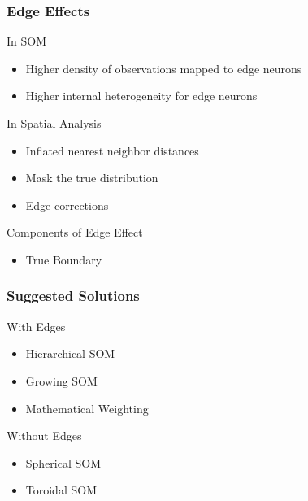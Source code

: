 \documentclass[nototal,handout]{beamer}
\begin{document}
\begin{frame}
	\frametitle{Edge Effects}
 
\begin{block}{In SOM}
 \begin{itemize}
 \item  Higher density of observations mapped to edge neurons
 \item  Higher internal heterogeneity for edge neurons
 \end{itemize}
 \end{block} 
\begin{block}{In Spatial Analysis}
 \begin{itemize}
 \item  Inflated nearest neighbor distances
 \item  Mask the true distribution
 \item  Edge corrections
 \end{itemize}
 \end{block} 
\begin{block}{Components of Edge Effect}
 \begin{itemize}
 \item  True Boundary
 \end{itemize}
 \end{block} \end{frame} 

\begin{frame}
	\frametitle{Suggested Solutions}
 
\begin{block}{With Edges}
 \begin{itemize}
 \item  Hierarchical SOM
 \item  Growing SOM
 \item  Mathematical Weighting
 \end{itemize}
 \end{block} 
\begin{block}{Without Edges}
 \begin{itemize}
 \item  Spherical SOM
 \item  Toroidal SOM
 \end{itemize}
 \end{block} \end{frame} 
\end{document}
